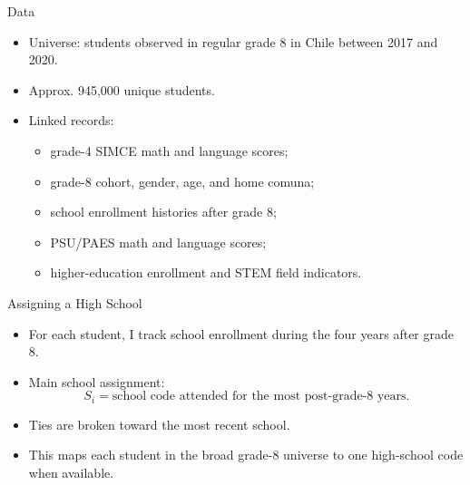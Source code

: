 \documentclass[notes,11pt,aspectratio=169]{beamer}
\newenvironment{wideitemize}{%
  \begin{minipage}{0.90\textwidth}
  \begin{itemize}
  \addtolength{\itemsep}{1em}
}{%
  \end{itemize}
  \end{minipage}
}
\begin{document}
\begin{frame}{Data}
\begin{wideitemize}
  \item Universe: students observed in regular grade 8 in Chile between 2017 and 2020.

  \item Approx. 945,000 unique students.

  \item Linked records:
  \begin{itemize}
    \item grade-4 SIMCE math and language scores;
    \item grade-8 cohort, gender, age, and home comuna;
    \item school enrollment histories after grade 8;
    \item PSU/PAES math and language scores;
    \item higher-education enrollment and STEM field indicators.
  \end{itemize}
\end{wideitemize}
\end{frame}

\begin{frame}{Assigning a High School}
\begin{wideitemize}
  \item For each student, I track school enrollment during the four years after grade 8.

  \item Main school assignment:
  \[
    S_i = \text{school code attended for the most post-grade-8 years}.
  \]

  \item Ties are broken toward the most recent school.

  \item This maps each student in the broad grade-8 universe to one high-school code when available.
\end{wideitemize}
\end{frame}
\end{document}
